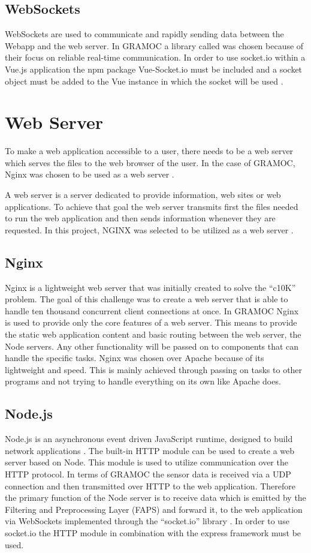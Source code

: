 \subsection{WebSockets}
WebSockets are used to communicate and rapidly sending data between the Webapp and the web server. In GRAMOC a library called  was chosen because of their focus on reliable real-time communication. In order to use socket.io within a Vue.js application the npm package Vue-Socket.io must be included and a socket object must be added to the Vue instance in which the socket will be used \cite{vuesocketio}.

\section{Web Server}
\label{sec:webserver}
To make a web application accessible to a user, there needs to be a web server which serves the files to the web browser of the user. In the case of GRAMOC, Nginx was chosen to be used as a web server \cite{nginx}.

A web server is a server dedicated to provide information, web sites or web applications. To achieve that goal the web server transmits first the files needed to run the web application and then sends information whenever they are requested. In this project, NGINX was selected to be utilized as a web server \cite{nginx}.

\subsection{Nginx}
Nginx is a lightweight web server that was initially created to solve the ``c10K'' problem. The goal of this challenge was to create a web server that is able to handle ten thousand concurrent client connections at once. In GRAMOC Nginx is used to provide only the core features of a web server. This means to provide the static web application content and basic routing between the web server, the Node servers. Any other functionality will be passed on to components that can handle the specific tasks. Nginx was chosen over Apache because of its lightweight and speed. This is mainly achieved through passing on tasks to other programs and not trying to handle everything on its own like Apache does.

\subsection{Node.js}
\label{subsec:nodejs}
Node.js is an asynchronous event driven JavaScript runtime, designed to build network applications \cite{Node}. The built-in HTTP module can be used to create a web server based on Node. This module is used to utilize communication over the HTTP protocol. In terms of GRAMOC the sensor data is received via a UDP connection and then transmitted over HTTP to the web application. Therefore the primary function of the Node server is to receive data which is emitted by the Filtering and Preprocessing Layer (FAPS) and forward it, to the web application via WebSockets implemented through the ``socket.io'' library \cite{socketio}. In order to use socket.io the HTTP module in combination with the express framework must be used.

